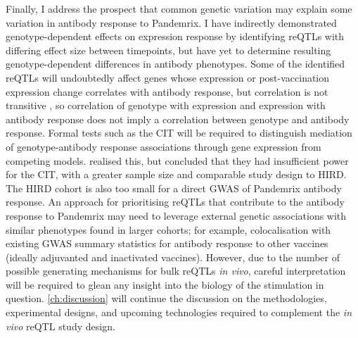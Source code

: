 Finally, I address the prospect that common genetic variation may explain some variation in antibody response to Pandemrix.
I have indirectly demonstrated genotype-dependent effects on expression response by identifying \glspl{reQTL} with differing effect size between timepoints,
but have yet to determine resulting genotype-dependent differences in antibody phenotypes.
Some of the identified \glspl{reQTL} will undoubtedly affect genes whose expression or post-vaccination expression change correlates with antibody response, 
but correlation is not transitive \autocite{langford2001PropertyBeingPositively},
so correlation of genotype with expression and expression with antibody response does not imply a correlation between genotype and antibody response.
Formal tests such as the CIT \autocite{millstein2009DisentanglingMolecularRelationships} will be required to distinguish mediation of genotype-antibody response associations through gene expression from competing models.
\textcite{franco2013IntegrativeGenomicAnalysis} realised this, but concluded that they had insufficient power for the CIT, with a greater sample size and comparable study design to \gls{HIRD}.
The \gls{HIRD} cohort is also too small for a direct \gls{GWAS} of Pandemrix antibody response.
An approach for prioritising \glspl{reQTL} that contribute to the antibody response to Pandemrix may need to leverage external genetic associations with similar phenotypes found in larger cohorts;
for example, colocalisation with existing \gls{GWAS} summary statistics for antibody response to other vaccines (ideally adjuvanted and inactivated vaccines).
However, due to the number of possible generating mechanisms for bulk \glspl{reQTL} \textit{in vivo},
careful interpretation will be required to glean any insight into the biology of the stimulation in question.
\cref{ch:discussion} will continue the discussion on the methodologies, experimental designs, and upcoming technologies required to complement the \textit{in vivo} \gls{reQTL} study design.
%
